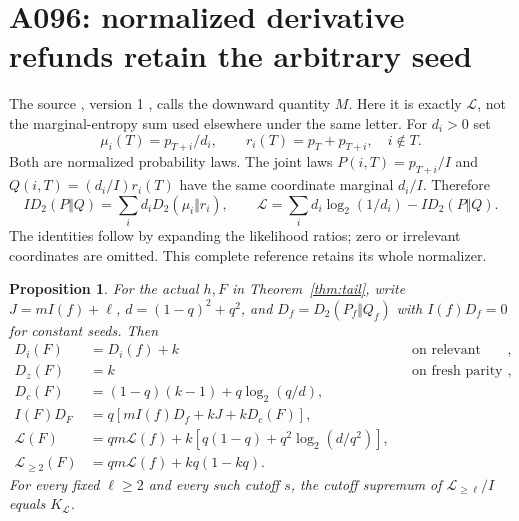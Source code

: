 \documentclass[11pt]{article}
\newtheorem{proposition}[lemma]{Proposition}
\begin{document}
\section{A096: normalized derivative refunds retain the arbitrary seed}
\label{sec:refund}
The source , version 1
\cite{A096c}, calls the downward quantity $M$.
Here it is exactly $\mathcal L$, not the marginal-entropy sum used
elsewhere under the same letter. For $d_i>0$ set
\[
 \mu_i(T)=p_{T+i}/d_i,\qquad r_i(T)=p_T+p_{T+i},\quad i\notin T.
\]
Both are normalized probability laws. The joint laws
$P(i,T)=p_{T+i}/I$ and $Q(i,T)=(d_i/I)r_i(T)$ have the same
coordinate marginal $d_i/I$. Therefore
\begin{equation}\label{eq:refundbaseline}
 I D_2(P\Vert Q)=\sum_i d_iD_2(\mu_i\Vert r_i),\qquad
 \mathcal L=\sum_i d_i\log_2(1/d_i)-I D_2(P\Vert Q).
\end{equation}
The identities follow by expanding the likelihood ratios; zero or irrelevant
coordinates are omitted. This complete reference retains its whole normalizer.
\begin{proposition}\label{prop:refund}
For the actual $h,F$ in Theorem~\ref{thm:tail}, write
$J=mI(f)+\ell$, $d=(1-q)^2+q^2$, and
$D_f=D_2(P_f\Vert Q_f)$ with $I(f)D_f=0$ for constant seeds. Then
\begin{align}
 D_i(F)&=D_i(f)+k &&\text{on relevant seed coordinates},\\
 D_z(F)&=k &&\text{on fresh parity coordinates},\\
 D_c(F)&=(1-q)(k-1)+q\log_2(q/d),\label{eq:refundcontrol}\\
 I(F)D_F&=q[mI(f)D_f+kJ+kD_c(F)],\label{eq:refundjoint}\\
 \mathcal L(F)&=qm\mathcal L(f)+
       k[q(1-q)+q^2\log_2(d/q^2)],\\
 \mathcal L_{\ge2}(F)&=qm\mathcal L(f)+kq(1-kq).
\end{align}
For every fixed $\ell\ge2$ and every such cutoff $s$, the cutoff
supremum of $\mathcal L_{\ge\ell}/I$ equals $K_{\mathcal L}$.
\end{proposition}
\end{document}
